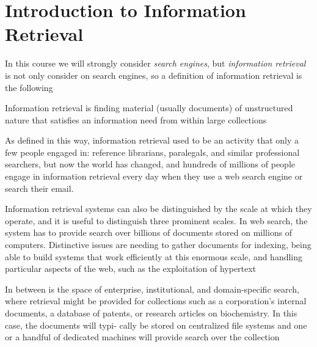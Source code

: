 \chapter{Introduction to Information Retrieval}
In this course we will strongly consider \emph{search engines}, but \emph{information retrieval} is not
only consider on search engines, so a definition of information retrieval is the following

\begin{defi}
Information retrieval is finding material (usually documents) of unstructured nature that satisfies
an information need from within large collections
\end{defi}
As defined in this way, information retrieval used to be an activity that only a few people engaged in:
reference librarians, paralegals, and similar professional searchers, but now the world has changed,
and hundreds of millions of people engage in information retrieval every day when 
they use a web search engine or search their email.

Information retrieval systems can also be distinguished by the scale at
which they operate, and it is useful to distinguish three prominent scales.
In web search, the system has to provide search over billions of documents
stored on millions of computers. Distinctive issues are needing to gather
documents for indexing, being able to build systems that work efficiently
at this enormous scale, and handling particular aspects of the web, such as
the exploitation of hypertext

In between is the space of enterprise,
institutional, and domain-specific search, where retrieval might be provided for
collections such as a corporation’s internal documents, a database of patents,
or research articles on biochemistry. In this case, the documents will typi-
cally be stored on centralized file systems and one or a handful of dedicated
machines will provide search over the collection

